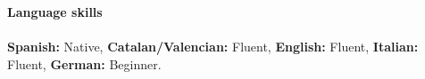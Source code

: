 \documentclass[letterpaper,english]{article}
\begin{document}
\begin{cv}{}
\vspace{0.25cm}
\noindent \large{\textbf{Language skills}}\\ \\
\normalsize
\textbf{Spanish:} Native,  \textbf{Catalan/Valencian:} Fluent, \textbf{English:} Fluent, \textbf{Italian:} Fluent, \textbf{German:} Beginner.\\
\vspace{0.25cm}



\end{cv}
\end{document}
